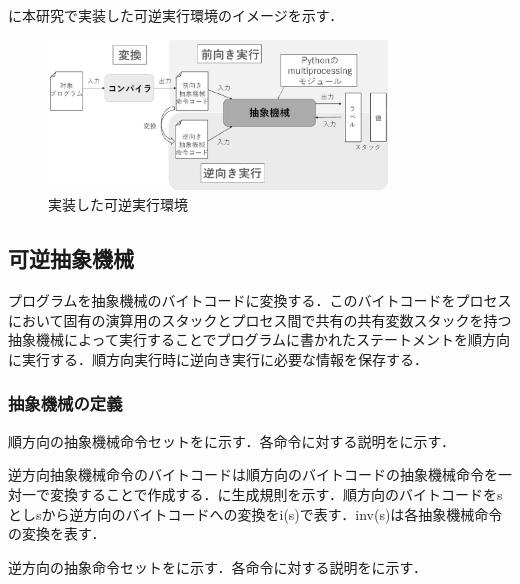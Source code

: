 \documentclass[submit,PRO]{ipsj}
\begin{document}
に本研究で実装した可逆実行環境のイメージを示す．


\begin{figure}[tb]
\includegraphics[height=4.0cm,width=9.0cm]{abstract.eps}
\caption{実装した可逆実行環境}
\label{fig:abst}
\end{figure}

\subsection{可逆抽象機械}
\label{sec:format}

プログラムを抽象機械のバイトコードに変換する．このバイトコードをプロセスにおいて固有の演算用のスタックとプロセス間で共有の共有変数スタックを持つ抽象機械によって実行することでプログラムに書かれたステートメントを順方向に実行する．順方向実行時に逆向き実行に必要な情報を保存する．




\subsubsection{抽象機械の定義}

順方向の抽象機械命令セットをに示す．各命令に対する説明をに示す．

逆方向抽象機械命令のバイトコードは順方向のバイトコードの抽象機械命令を一対一で変換することで作成する．に生成規則を示す．順方向のバイトコードをsとしsから逆方向のバイトコードへの変換をi(s)で表す．inv(s)は各抽象機械命令の変換を表す．

逆方向の抽象命令セットをに示す．各命令に対する説明をに示す．
\end{document}
